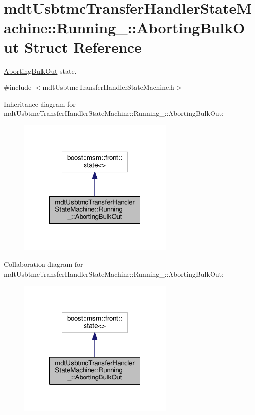 \hypertarget{structmdt_usbtmc_transfer_handler_state_machine_1_1_running___1_1_aborting_bulk_out}{\section{mdt\-Usbtmc\-Transfer\-Handler\-State\-Machine\-:\-:Running\-\_\-\-:\-:Aborting\-Bulk\-Out Struct Reference}
\label{structmdt_usbtmc_transfer_handler_state_machine_1_1_running___1_1_aborting_bulk_out}
}


\hyperlink{structmdt_usbtmc_transfer_handler_state_machine_1_1_running___1_1_aborting_bulk_out}{Aborting\-Bulk\-Out} state.  




{\ttfamily \#include $<$mdt\-Usbtmc\-Transfer\-Handler\-State\-Machine.\-h$>$}



Inheritance diagram for mdt\-Usbtmc\-Transfer\-Handler\-State\-Machine\-:\-:Running\-\_\-\-:\-:Aborting\-Bulk\-Out\-:\nopagebreak
\begin{figure}[H]
\begin{center}
\leavevmode
\includegraphics[width=216pt]{structmdt_usbtmc_transfer_handler_state_machine_1_1_running___1_1_aborting_bulk_out__inherit__graph}
\end{center}
\end{figure}


Collaboration diagram for mdt\-Usbtmc\-Transfer\-Handler\-State\-Machine\-:\-:Running\-\_\-\-:\-:Aborting\-Bulk\-Out\-:\nopagebreak
\begin{figure}[H]
\begin{center}
\leavevmode
\includegraphics[width=216pt]{structmdt_usbtmc_transfer_handler_state_machine_1_1_running___1_1_aborting_bulk_out__coll__graph}
\end{center}
\end{figure}
